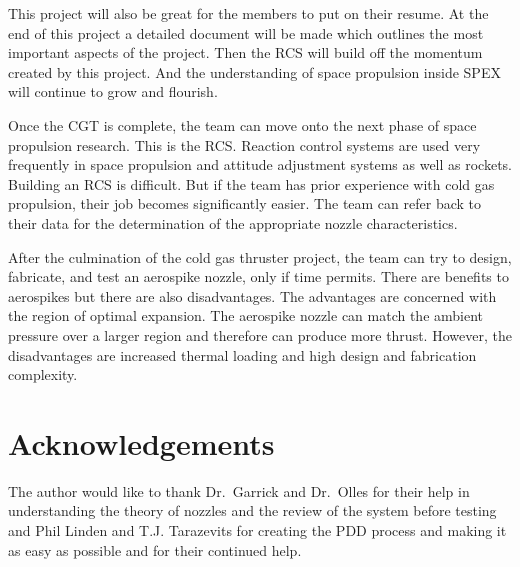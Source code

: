 \documentclass[conference]{IEEEtran} %
\begin{document}
This project will also be great for
the members to put on their resume. At the end of this project a detailed document will be made which outlines the most important aspects of the project.
Then the RCS will build off the momentum created by this project. And the understanding of space propulsion inside SPEX will continue to grow and flourish.

Once the CGT is complete, the team can move onto the next phase of space propulsion research. This is the RCS\@. Reaction control systems are used very
frequently in space propulsion and attitude adjustment systems as well as rockets. Building an RCS is difficult. But if the team
has prior experience with cold gas propulsion, their job becomes significantly easier. The team can refer back to their data for the determination of the
appropriate nozzle characteristics.

After the culmination of the cold gas thruster project, the team can try to design, fabricate, and test an aerospike nozzle, only if time permits.
There are benefits to aerospikes but there are also disadvantages. The advantages are concerned with the region of optimal expansion. The aerospike nozzle can match the
ambient pressure over a larger region and therefore can produce more thrust. However, the disadvantages are increased thermal loading and high design and fabrication complexity\cite{SPAD}.

\section*{Acknowledgements}
The author would like to thank Dr.\ Garrick and Dr.\ Olles for their help in understanding the theory of nozzles and the review of the system before testing and
Phil Linden and T.J. Tarazevits for creating the PDD process and making it as easy as possible and for their continued help.




\onecolumn
\appendices{}
\end{document}
